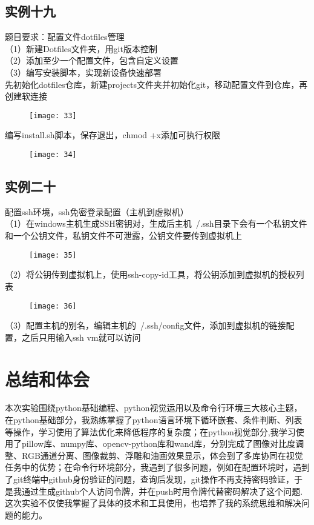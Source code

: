 \documentclass[12pt,letterpaper]{article}
\begin{document}
\subsection{实例十九}
题目要求：配置文件dotfiles管理\\
（1）新建Dotfiles文件夹，用git版本控制\\
（2）添加至少一个配置文件，包含自定义设置\\
（3）编写安装脚本，实现新设备快速部署\\
先初始化dotfiles仓库，新建projects文件夹并初始化git，移动配置文件到仓库，再创建软连接
\begin{figure}[H]
\centering
\texttt{[image: 33]}
\end{figure}
编写install.sh脚本，保存退出，chmod +x添加可执行权限
\begin{figure}[H]
\centering
\texttt{[image: 34]}
\end{figure}

\subsection{实例二十}
配置ssh环境，ssh免密登录配置（主机到虚拟机）\\
（1）在windows主机生成SSH密钥对，生成后主机~/.ssh目录下会有一个私钥文件和一个公钥文件，私钥文件不可泄露，公钥文件要传到虚拟机上
\begin{figure}[H]
\centering
\texttt{[image: 35]}
\end{figure}
（2）将公钥传到虚拟机上，使用ssh-copy-id工具，将公钥添加到虚拟机的授权列表
\begin{figure}[H]
\centering
\texttt{[image: 36]}
\end{figure}
（3）配置主机的别名，编辑主机的~/.ssh/config文件，添加到虚拟机的链接配置，之后只用输入ssh vm就可以访问

\section{总结和体会}
本次实验围绕python基础编程、python视觉运用以及命令行环境三大核心主题，在python基础部分，我熟练掌握了python语言环境下循环嵌套、条件判断、列表等操作，学习使用了算法优化来降低程序的复杂度；在python视觉部分,我学习使用了pillow库、numpy库、opencv-python库和wand库，分别完成了图像对比度调整、RGB通道分离、图像裁剪、浮雕和油画效果显示，体会到了多库协同在视觉任务中的优势；在命令行环境部分，我遇到了很多问题，例如在配置环境时，遇到了git终端中github身份验证的问题，查询后发现，git操作不再支持密码验证，于是我通过生成github个人访问令牌，并在push时用令牌代替密码解决了这个问题.这次实验不仅使我掌握了具体的技术和工具使用，也培养了我的系统思维和解决问题的能力。
\end{document}
